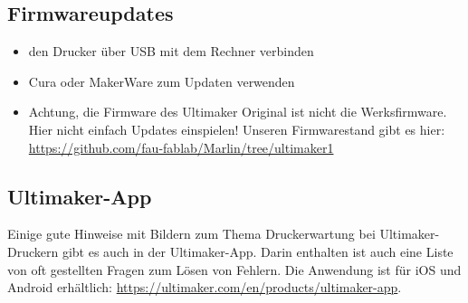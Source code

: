 \documentclass{\basedir/fablab-document}
\begin{document}
\subsection{Firmwareupdates}

\begin{itemize}
\item den Drucker über USB mit dem Rechner verbinden
\item Cura oder MakerWare zum Updaten verwenden
\item Achtung, die Firmware des Ultimaker Original ist nicht die Werksfirmware. Hier nicht einfach Updates einspielen! Unseren Firmwarestand gibt es hier: \url{https://github.com/fau-fablab/Marlin/tree/ultimaker1}
\end{itemize}

\subsection{Ultimaker-App}

Einige gute Hinweise mit Bildern zum Thema Druckerwartung bei Ultimaker-Druckern gibt es auch in der Ultimaker-App.
Darin enthalten ist auch eine Liste von oft gestellten Fragen zum Lösen von Fehlern.
Die Anwendung ist für iOS und Android erhältlich: \url{https://ultimaker.com/en/products/ultimaker-app}.
\end{document}
